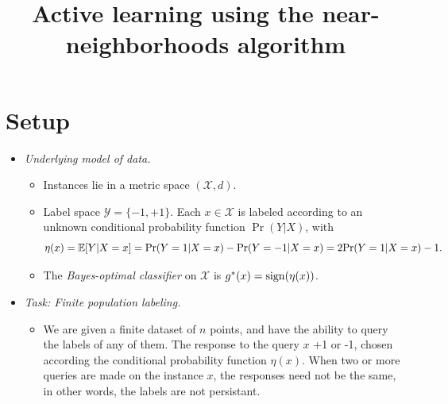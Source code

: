 \documentclass{article}
\title{Active learning using the near-neighborhoods algorithm}
\def\pr{{\rm Pr}}
\def\E{{\mathbb E}}
\def\X{{\mathcal X}}
\def\Y{{\mathcal Y}}
\def\sign{{\rm sign}}
\begin{document}
\maketitle

\section{Setup}

\begin{itemize}
\item {\it Underlying model of data.}

\begin{itemize}
\item Instances lie in a metric space $(\X, d)$. 
\item Label space $\Y = \{-1,+1\}$. Each $x \in \X$ is labeled according to an unknown conditional probability function $\Pr(Y|X)$, with
$$ \eta(x) = \E[Y | X=x] = \pr(Y=1|X=x) - \pr(Y=-1|X=x) = 2 \pr(Y=1|X=x) - 1 .$$
\item The {\it Bayes-optimal classifier} on $\X$ is $g^*(x) = \sign(\eta(x))$.
\end{itemize}

\item {\it Task: Finite population labeling.}

\begin{itemize}
\item We are given a finite dataset of $n$ points, and have the ability to query the labels of any of them. The response to the query $x$ +1 or -1, chosen according the conditional probability function $\eta(x)$. When two or more queries are made on the instance $x$, the responses need not be the same, in other words, the labels are not persistant. 


\end{itemize}
\end{itemize}
\end{document}
